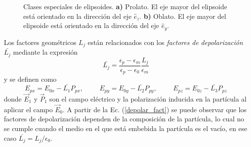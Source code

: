 
\begin{figure}[h!]
	\quad%
	\caption{Clases especiales de elipsoides. \textbf{a)} Prolato. El eje mayor del elipsoide está orientado en la dirección del eje $\hat{e}_z$. \textbf{b)} Oblato. El eje mayor del elipsoide está orientado en la dirección del eje $\hat{e}_y$.}\label{fig:test}
\end{figure}


Los factores geométricos $L_j$ están relacionados con los \textit{factores de depolarización} $\bar{L_j}$ mediante la expresión \cite{Bohren}
\begin{equation}
	\bar{L_j}=\frac{\epsilon_p-\epsilon_m}{\epsilon_p-\epsilon_0}\frac{L_j}{\epsilon_m}
	\label{depolar_fact}
\end{equation}
y se definen como 
\begin{equation*}
    E_{px}=E_{0x}-\bar{L_1}P_{px},\hspace{1cm}    E_{py}=E_{0y}-\bar{L_2}P_{py},\hspace{1cm}    E_{pz}=E_{0z}-\bar{L_3}P_{pz}
\end{equation*}
donde $\Vec{E}_1$ y $\Vec{P}_1$ son el campo eléctrico y la polarización inducida en la partícula al aplicar el campo $\Vec{E}_0$. A partir de la Ec. (\ref{depolar_fact}) se puede observar que los factores de depolarización dependen de la composición de la partícula, lo cual no se cumple cuando el medio en el que está embebida la partícula es el vacío, en ese caso $\bar{L_j}=L_j/\epsilon_0$. 